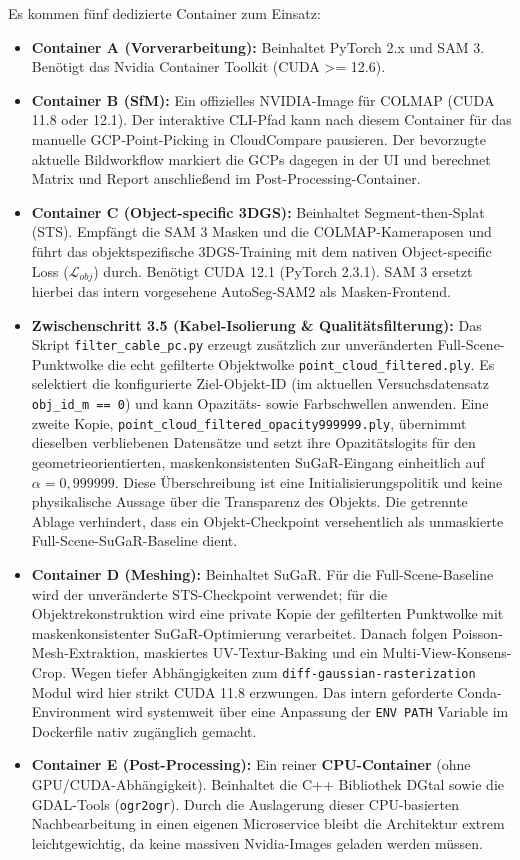 \documentclass[12pt,a4paper]{article}
\begin{document}
Es kommen fünf dedizierte Container zum Einsatz:
\begin{itemize}
    \item \textbf{Container A (Vorverarbeitung):} Beinhaltet PyTorch 2.x und SAM 3. Benötigt das Nvidia Container Toolkit (CUDA >= 12.6).
    \item \textbf{Container B (SfM):} Ein offizielles NVIDIA-Image für COLMAP (CUDA 11.8 oder 12.1). Der interaktive CLI-Pfad kann nach diesem Container für das manuelle GCP-Point-Picking in CloudCompare pausieren. Der bevorzugte aktuelle Bildworkflow markiert die GCPs dagegen in der UI und berechnet Matrix und Report anschließend im Post-Processing-Container.
    \item \textbf{Container C (Object-specific 3DGS):} Beinhaltet Segment-then-Splat (STS). Empfängt die SAM 3 Masken und die COLMAP-Kameraposen und führt das objektspezifische 3DGS-Training mit dem nativen Object-specific Loss ($\mathcal{L}_{obj}$) durch. Benötigt CUDA 12.1 (PyTorch 2.3.1). SAM 3 ersetzt hierbei das intern vorgesehene AutoSeg-SAM2 als Masken-Frontend.
    \item \textbf{Zwischenschritt 3.5 (Kabel-Isolierung \& Qualitätsfilterung):} Das Skript \texttt{filter\_cable\_pc.py} erzeugt zusätzlich zur unveränderten Full-Scene-Punktwolke die echt gefilterte Objektwolke \texttt{point\_cloud\_filtered.ply}. Es selektiert die konfigurierte Ziel-Objekt-ID (im aktuellen Versuchsdatensatz \texttt{obj\_id\_m == 0}) und kann Opazitäts- sowie Farbschwellen anwenden. Eine zweite Kopie, \texttt{point\_cloud\_filtered\_opacity999999.ply}, übernimmt dieselben verbliebenen Datensätze und setzt ihre Opazitätslogits für den geometrieorientierten, maskenkonsistenten SuGaR-Eingang einheitlich auf \(\alpha=0{,}999999\). Diese Überschreibung ist eine Initialisierungspolitik und keine physikalische Aussage über die Transparenz des Objekts. Die getrennte Ablage verhindert, dass ein Objekt-Checkpoint versehentlich als unmaskierte Full-Scene-SuGaR-Baseline dient.
    \item \textbf{Container D (Meshing):} Beinhaltet SuGaR. Für die Full-Scene-Baseline wird der unveränderte STS-Checkpoint verwendet; für die Objektrekonstruktion wird eine private Kopie der gefilterten Punktwolke mit maskenkonsistenter SuGaR-Optimierung verarbeitet. Danach folgen Poisson-Mesh-Extraktion, maskiertes UV-Textur-Baking und ein Multi-View-Konsens-Crop. Wegen tiefer Abhängigkeiten zum \texttt{diff-gaussian-rasterization} Modul wird hier strikt CUDA 11.8 erzwungen. Das intern geforderte Conda-Environment wird systemweit über eine Anpassung der \texttt{ENV PATH} Variable im Dockerfile nativ zugänglich gemacht.
    \item \textbf{Container E (Post-Processing):} Ein reiner \textbf{CPU-Container} (ohne GPU/CUDA-Abhängigkeit). Beinhaltet die C++ Bibliothek DGtal sowie die GDAL-Tools (\texttt{ogr2ogr}). Durch die Auslagerung dieser CPU-basierten Nachbearbeitung in einen eigenen Microservice bleibt die Architektur extrem leichtgewichtig, da keine massiven Nvidia-Images geladen werden müssen.
\end{itemize}
\end{document}
